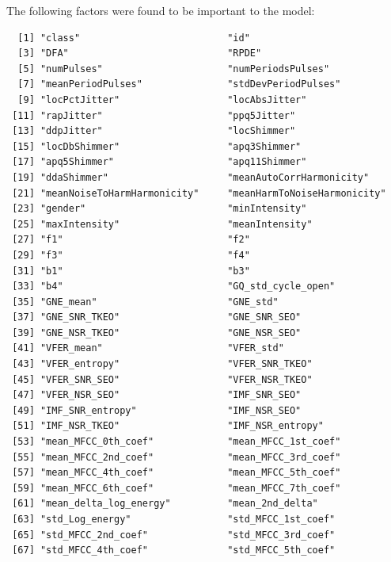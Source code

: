 \documentclass[
]{article}
\begin{document}
The following factors were found to be important to the model:

\begin{verbatim}
  [1] "class"                          "id"                            
  [3] "DFA"                            "RPDE"                          
  [5] "numPulses"                      "numPeriodsPulses"              
  [7] "meanPeriodPulses"               "stdDevPeriodPulses"            
  [9] "locPctJitter"                   "locAbsJitter"                  
 [11] "rapJitter"                      "ppq5Jitter"                    
 [13] "ddpJitter"                      "locShimmer"                    
 [15] "locDbShimmer"                   "apq3Shimmer"                   
 [17] "apq5Shimmer"                    "apq11Shimmer"                  
 [19] "ddaShimmer"                     "meanAutoCorrHarmonicity"       
 [21] "meanNoiseToHarmHarmonicity"     "meanHarmToNoiseHarmonicity"    
 [23] "gender"                         "minIntensity"                  
 [25] "maxIntensity"                   "meanIntensity"                 
 [27] "f1"                             "f2"                            
 [29] "f3"                             "f4"                            
 [31] "b1"                             "b3"                            
 [33] "b4"                             "GQ_std_cycle_open"             
 [35] "GNE_mean"                       "GNE_std"                       
 [37] "GNE_SNR_TKEO"                   "GNE_SNR_SEO"                   
 [39] "GNE_NSR_TKEO"                   "GNE_NSR_SEO"                   
 [41] "VFER_mean"                      "VFER_std"                      
 [43] "VFER_entropy"                   "VFER_SNR_TKEO"                 
 [45] "VFER_SNR_SEO"                   "VFER_NSR_TKEO"                 
 [47] "VFER_NSR_SEO"                   "IMF_SNR_SEO"                   
 [49] "IMF_SNR_entropy"                "IMF_NSR_SEO"                   
 [51] "IMF_NSR_TKEO"                   "IMF_NSR_entropy"               
 [53] "mean_MFCC_0th_coef"             "mean_MFCC_1st_coef"            
 [55] "mean_MFCC_2nd_coef"             "mean_MFCC_3rd_coef"            
 [57] "mean_MFCC_4th_coef"             "mean_MFCC_5th_coef"            
 [59] "mean_MFCC_6th_coef"             "mean_MFCC_7th_coef"            
 [61] "mean_delta_log_energy"          "mean_2nd_delta"                
 [63] "std_Log_energy"                 "std_MFCC_1st_coef"             
 [65] "std_MFCC_2nd_coef"              "std_MFCC_3rd_coef"             
 [67] "std_MFCC_4th_coef"              "std_MFCC_5th_coef"             

\end{verbatim}
\end{document}

